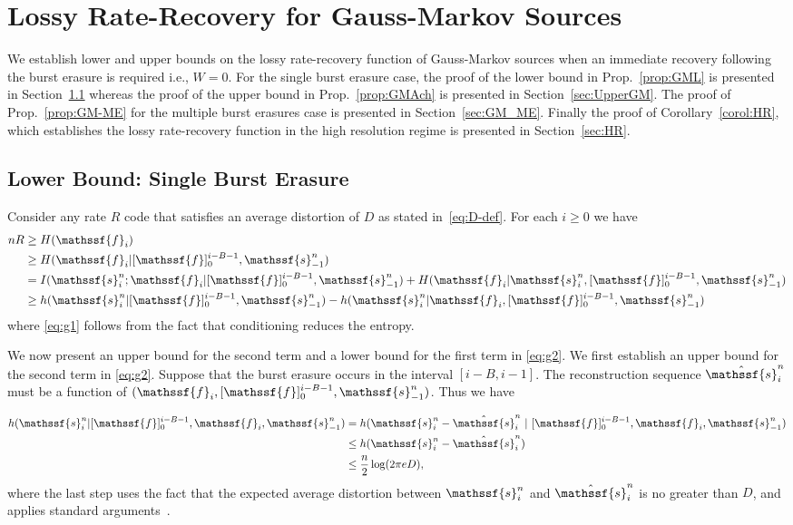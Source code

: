 \documentclass[journal, twocolumn, 10pt]{IEEEtran}
\newcommand{\rvf}{{\mathssf{f}}}    %
\newcommand{\rvs}{{\mathssf{s}}}    %
\begin{document}
\section{Lossy Rate-Recovery for Gauss-Markov Sources}
\label{sec:GM}
We establish lower and upper bounds on the lossy rate-recovery function of Gauss-Markov sources when an immediate recovery following the burst erasure is required i.e., ${W=0}$. For the single burst erasure case, the proof of  the lower bound in Prop.~\ref{prop:GML} is presented in Section~\ref{sec:LowerGM} whereas the proof of the upper bound in Prop.~\ref{prop:GMAch} is presented in Section~\ref{sec:UpperGM}. The proof of Prop.~\ref{prop:GM-ME} for the multiple burst erasures case is presented in Section~\ref{sec:GM_ME}. Finally the proof of Corollary~\ref{corol:HR}, which establishes the lossy rate-recovery function in the high resolution regime is presented in Section~\ref{sec:HR}.  

\subsection{Lower Bound: Single Burst Erasure}
\label{sec:LowerGM}
Consider any rate $R$ code that satisfies an average distortion of $D$ as stated in~\eqref{eq:D-def}.
For each $i \ge 0$ we have
\begin{align}
nR & \ge H(\rvf_{i})\notag\\
& \ge H(\rvf_{i}|[\rvf]_{0}^{i-B-1}, \rvs^n_{-1})\label{eq:g1} \\
& = I(\rvs^n_{i} ; \rvf_{i} |  [\rvf]_{0}^{i-B-1}, \rvs^n_{-1}) + H(\rvf_{i} | \rvs^n_{i} , [\rvf]_{0}^{i-B-1}, \rvs^n_{-1})
\notag\\
&\ge h(\rvs^n_{i} |  [\rvf]_{0}^{i-B-1} , \rvs^n_{-1}) - h(\rvs^n_{i} | \rvf_{i} ,  [\rvf]_{0}^{i-B-1}, \rvs^n_{-1}) \label{eq:g2}
\end{align} where \eqref{eq:g1} follows from the fact that conditioning reduces the entropy. 

We now present an upper bound for the second term and a lower bound for the first term in \eqref{eq:g2}. We first establish an upper bound for the second term in \eqref{eq:g2}. Suppose that the burst erasure occurs in the interval ${[i-B, i-1]}$. The reconstruction sequence $\hat{\rvs}_i^n$ must be a function of $(\rvf_{i} ,  [\rvf]_{0}^{i-B-1}, \rvs^n_{-1})$. Thus we have

\begin{align}
h(\rvs_{i}^n|[\rvf]_{0}^{i-B-1},\rvf_{i}, \rvs^n_{-1})& = h(\rvs_{i}^n-\hat{\rvs}_{i}^n~|~[\rvf]_{0}^{i-B-1},\rvf_{i}, \rvs^n_{-1})\notag\\
&\le h(\rvs_{i}^n-\hat{\rvs}_{i}^n) \notag\\
&\le \frac{n}{2} \log(2\pi e D) \label{eq:3},
\end{align} where the last step uses the fact that the expected average distortion between $\rvs^n_i$ and $\hat{\rvs}^n_i$ is no greater than $D$, and applies standard arguments~\cite[Ch.~13]{coverThomas}.
\end{document}
